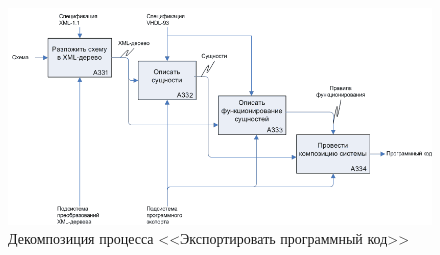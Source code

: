 \begin{figure}[H]
  \centering
  \includegraphics[width=1.0\textwidth]{diagrams/idef/a33-b.png}
  \caption{Декомпозиция процесса <<Экспортировать программный код>>}
  \label{fig:export-vhdl}
\end{figure}